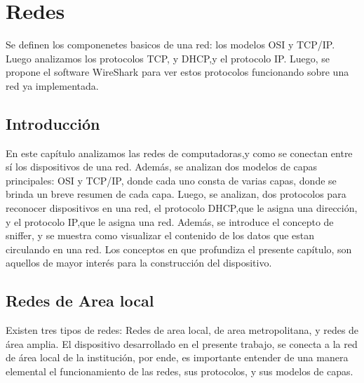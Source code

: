 \renewcommand{\chaptername}{Redes}  
\graphicspath{{parte_2/redes/}}
\chapter{Redes}
\markright{\chaptername }

\begin{center}
	\begin{tcolorbox}[colback=gray!5!white, %
		colframe=blue!75!black,
		title= \center{\Large{resumen}} ]
		Se definen los componenetes basicos de una red: los modelos OSI y TCP/IP. Luego analizamos los protocolos TCP, y DHCP,y el protocolo IP. Luego, se propone el software WireShark para ver estos protocolos funcionando sobre una red ya implementada. 
	\end{tcolorbox}
\end{center}    
\section{Introducción} 
En este capítulo analizamos las redes de computadoras,y como se conectan entre sí los dispositivos de una red. Además, se analizan dos modelos de capas principales: OSI y TCP/IP, donde cada uno consta de varias capas, donde se brinda un breve resumen de cada capa. 
Luego, se analizan, dos protocolos para reconocer dispositivos en una red, el protocolo DHCP,que le asigna una dirección, y el protocolo IP,que le asigna una red. Además, se introduce el concepto de sniffer, y se muestra como visualizar el contenido de los datos que estan circulando en una red. Los conceptos en que profundiza el presente capítulo, son aquellos de mayor interés para la construcción del dispositivo.  

\section{Redes de Area local }
Existen tres tipos de redes: Redes de area local, de area metropolitana, y redes de área amplia. El dispositivo desarrollado en el presente trabajo, se conecta a la red de área local de la institución, por ende, es importante entender de una manera elemental el funcionamiento de las redes, sus protocolos, y sus modelos de capas.   

